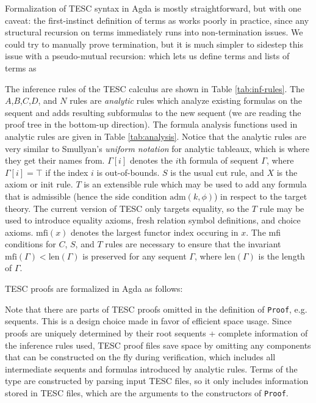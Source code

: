 \documentclass[12pt]{article}
\newcommand{\len}[0]{\mathrm{len}}
\newcommand{\mfi}[0]{\mathrm{mfi}}
\newcommand{\adm}[0]{\mathrm{adm}}
\begin{document}
Formalization of TESC syntax in Agda is mostly straightforward, but with one 
caveat: the first-instinct definition of terms as 
works poorly in practice, since any structural recursion on terms immediately 
runs into non-termination issues. We could try to manually prove termination,
but it is much simpler to sidestep this issue with a pseudo-mutual recursion:
which lets us define terms and lists of terms as




The inference rules of the TESC calculus are shown in Table \ref{tab:inf-rules}.
The $A$,$B$,$C$,$D$, and $N$ rules are \textit{analytic} rules which analyze  
existing formulas on the sequent and adds resulting subformulas to the new 
sequent (we are reading the proof tree in the bottom-up direction).
The formula analysis functions used in analytic rules are given in Table 
\ref{tab:analysis}. Notice that the analytic rules are very similar to 
Smullyan's \textit{uniform notation} for analytic tableaux, which is where 
they get their names from. $\Gamma[i]$ denotes the $i$th formula of sequent 
$\Gamma$, where $\Gamma[i] = \top$ if the index $i$ is out-of-bounds. 
$S$ is the usual cut rule, and $X$ is the axiom or init rule. $T$ is an 
extensible rule which may be used to add any formula that is admissible 
(hence the side condition $\adm(k,\phi)$)
in respect to the target theory. The current version of TESC only targets
equality, so the $T$ rule may be used to introduce equality axioms,
fresh relation symbol definitions, and choice axioms. $\mfi(x)$ denotes 
the largest functor index occuring in $x$. The mfi conditions for $C$, 
$S$, and $T$ rules are necessary to ensure that the invariant 
$\mfi(\Gamma) < \len(\Gamma)$ is preserved for any sequent $\Gamma$, 
where $\len(\Gamma)$ is the length of $\Gamma$.

TESC proofs are formalized in Agda as follows:

Note that there are parts of TESC proofs omitted in the definition of 
\verb|Proof|, e.g. sequents. This is a design choice made in favor of
efficient space usage. Since proofs are uniquely determined by their
root sequents + complete information of the inference rules used,
TESC proof files save space by omitting any components that can be 
constructed on the fly during verification, which includes all intermediate 
sequents and formulas introduced by analytic rules. Terms of the type 
 are constructed by parsing input TESC files, 
so it only includes information stored in TESC files, which are the arguments 
to the constructors of \verb|Proof|.
\end{document}
